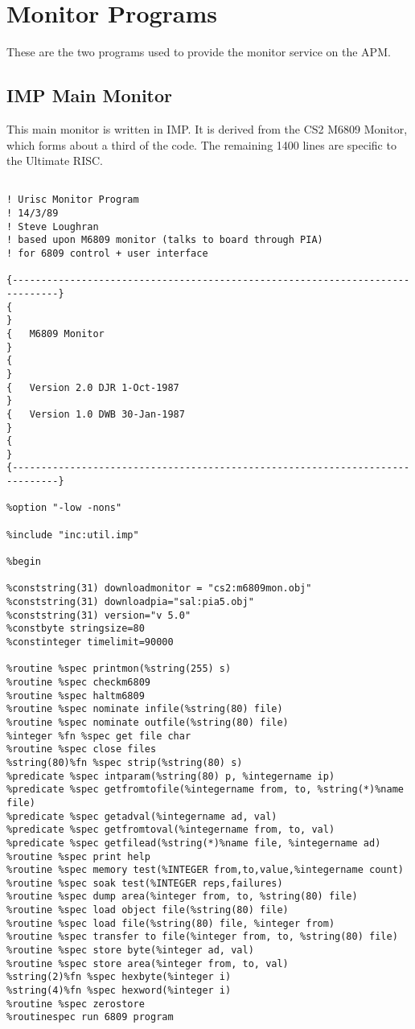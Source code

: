 \chapter{Monitor Programs}
These are the two programs used to provide the monitor service on the
APM.
\section{IMP Main Monitor}
This main monitor is written in IMP.
It is derived from the CS2 M6809 Monitor, which forms about a third of the code.
The remaining 1400 lines are specific to the Ultimate RISC.

\begin{verbatim}

! Urisc Monitor Program
! 14/3/89 
! Steve Loughran
! based upon M6809 monitor (talks to board through PIA)
! for 6809 control + user interface

{------------------------------------------------------------------------------}
{                                                                              }
{   M6809 Monitor                                                              }
{                                                                              }
{   Version 2.0 DJR 1-Oct-1987                                                 }
{   Version 1.0 DWB 30-Jan-1987                                                }
{                                                                              }
{------------------------------------------------------------------------------}

%option "-low -nons"

%include "inc:util.imp"

%begin

%conststring(31) downloadmonitor = "cs2:m6809mon.obj"
%conststring(31) downloadpia="sal:pia5.obj"
%conststring(31) version="v 5.0"
%constbyte stringsize=80
%constinteger timelimit=90000

%routine %spec printmon(%string(255) s)
%routine %spec checkm6809
%routine %spec haltm6809
%routine %spec nominate infile(%string(80) file)
%routine %spec nominate outfile(%string(80) file)
%integer %fn %spec get file char
%routine %spec close files
%string(80)%fn %spec strip(%string(80) s)
%predicate %spec intparam(%string(80) p, %integername ip)
%predicate %spec getfromtofile(%integername from, to, %string(*)%name file)
%predicate %spec getadval(%integername ad, val)
%predicate %spec getfromtoval(%integername from, to, val)
%predicate %spec getfilead(%string(*)%name file, %integername ad)
%routine %spec print help
%routine %spec memory test(%INTEGER from,to,value,%integername count)
%routine %spec soak test(%INTEGER reps,failures)
%routine %spec dump area(%integer from, to, %string(80) file)
%routine %spec load object file(%string(80) file)
%routine %spec load file(%string(80) file, %integer from)
%routine %spec transfer to file(%integer from, to, %string(80) file)
%routine %spec store byte(%integer ad, val)
%routine %spec store area(%integer from, to, val)
%string(2)%fn %spec hexbyte(%integer i)
%string(4)%fn %spec hexword(%integer i)
%routine %spec zerostore
%routinespec run 6809 program


\end{verbatim}
